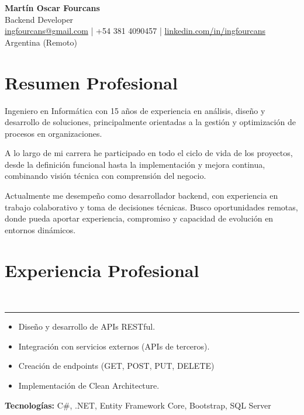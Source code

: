 \documentclass[10pt,a4paper]{article}
\begin{document}
\begin{center}
    {\LARGE \textbf{Martín Oscar Fourcans}} \\
    \vspace{2pt}
    Backend Developer \\
    \vspace{2pt}
    \href{mailto:ingfourcans@gmail.com}{ingfourcans@gmail.com} \quad | \quad 
    +54 381 4090457 \quad | \quad 
    \href{https://linkedin.com/in/ingfourcans}{linkedin.com/in/ingfourcans} \\
    Argentina (Remoto)
\end{center}

\vspace{3pt}

\section*{Resumen Profesional}

Ingeniero en Informática con 15 años de experiencia en análisis, diseño y desarrollo de soluciones, principalmente orientadas a la gestión y optimización de procesos en organizaciones.

A lo largo de mi carrera he participado en todo el ciclo de vida de los proyectos, desde la definición funcional hasta la implementación y mejora continua, combinando visión técnica con comprensión del negocio.

Actualmente me desempeño como desarrollador backend, con experiencia en trabajo colaborativo y toma de decisiones técnicas. Busco oportunidades remotas, donde pueda aportar experiencia, compromiso y capacidad de evolución en entornos dinámicos.

\vspace{3pt}

\section*{Experiencia Profesional}

\\[-3pt]
{\rule{\textwidth}{0.25pt}}
\begin{itemize}
    \item Diseño y desarrollo de APIs RESTful.
    \item Integración con servicios externos (APIs de terceros).
    \item Creación de endpoints (GET, POST, PUT, DELETE)
    \item Implementación de Clean Architecture.
\end{itemize}
\vspace{2pt}
{\small \textbf{Tecnologías:} C\#, .NET, Entity Framework Core, Bootstrap, SQL Server}
\end{document}
